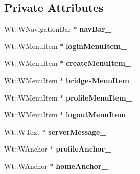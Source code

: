 \subsection*{Private Attributes}
\begin{DoxyCompactItemize}
\item 
Wt\+::\+W\+Navigation\+Bar $\ast$ {\bfseries nav\+Bar\+\_\+}\hypertarget{classWelcomeScreen_a4667ce16e321647494567feadd35d05c}{}\label{classWelcomeScreen_a4667ce16e321647494567feadd35d05c}

\item 
Wt\+::\+W\+Menu\+Item $\ast$ {\bfseries login\+Menu\+Item\+\_\+}\hypertarget{classWelcomeScreen_a6866061b373f0f60e644ce3ae0d8783a}{}\label{classWelcomeScreen_a6866061b373f0f60e644ce3ae0d8783a}

\item 
Wt\+::\+W\+Menu\+Item $\ast$ {\bfseries create\+Menu\+Item\+\_\+}\hypertarget{classWelcomeScreen_aa78bc9664decc36f6eb6e81d9bd6f62d}{}\label{classWelcomeScreen_aa78bc9664decc36f6eb6e81d9bd6f62d}

\item 
Wt\+::\+W\+Menu\+Item $\ast$ {\bfseries bridges\+Menu\+Item\+\_\+}\hypertarget{classWelcomeScreen_a33f154c6595ce305c06bad498ec993cb}{}\label{classWelcomeScreen_a33f154c6595ce305c06bad498ec993cb}

\item 
Wt\+::\+W\+Menu\+Item $\ast$ {\bfseries profile\+Menu\+Item\+\_\+}\hypertarget{classWelcomeScreen_a3ebebbe939515f59f78ed2af34523da2}{}\label{classWelcomeScreen_a3ebebbe939515f59f78ed2af34523da2}

\item 
Wt\+::\+W\+Menu\+Item $\ast$ {\bfseries logout\+Menu\+Item\+\_\+}\hypertarget{classWelcomeScreen_a6737befd56f21e10ea6426eee30c8943}{}\label{classWelcomeScreen_a6737befd56f21e10ea6426eee30c8943}

\item 
Wt\+::\+W\+Text $\ast$ {\bfseries server\+Message\+\_\+}\hypertarget{classWelcomeScreen_adf01c5bef52bb8f08dd2f6e973d06761}{}\label{classWelcomeScreen_adf01c5bef52bb8f08dd2f6e973d06761}

\item 
Wt\+::\+W\+Anchor $\ast$ {\bfseries profile\+Anchor\+\_\+}\hypertarget{classWelcomeScreen_ab307ac80202c76a641fe69c79b75e4c8}{}\label{classWelcomeScreen_ab307ac80202c76a641fe69c79b75e4c8}

\item 
Wt\+::\+W\+Anchor $\ast$ {\bfseries home\+Anchor\+\_\+}\hypertarget{classWelcomeScreen_a343ab978f9d097e2af07f92f3a09d979}{}\label{classWelcomeScreen_a343ab978f9d097e2af07f92f3a09d979}


\end{DoxyCompactItemize}
